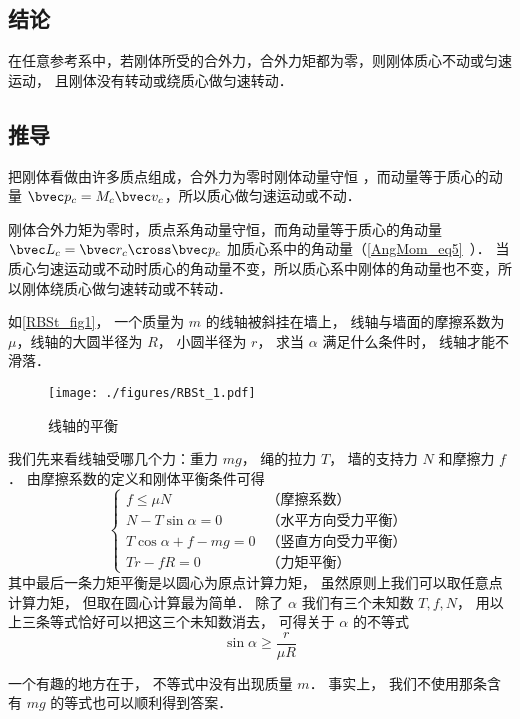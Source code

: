 
\subsection{结论}
在任意参考系中，若刚体所受的合外力，合外力矩都为零，则刚体质心不动或匀速运动， 且刚体没有转动或绕质心做匀速转动．

\subsection{推导}
把刚体看做由许多质点组成，合外力为零时刚体动量守恒%
，而动量等于质心的动量
$\bvec p_c = M_c \bvec v_c$，所以质心做匀速运动或不动．

刚体合外力矩为零时，质点系角动量守恒，而角动量等于质心的角动量 $\bvec L_c =\bvec r_c\cross \bvec p_c$ 加质心系中的角动量（\autoref{AngMom_eq5}~）． 当质心匀速运动或不动时质心的角动量不变，所以质心系中刚体的角动量也不变，所以刚体绕质心做匀速转动或不转动．

\begin{example}{}\label{RBSt_ex1}
如\autoref{RBSt_fig1}， 一个质量为 $m$ 的线轴被斜挂在墙上， 线轴与墙面的摩擦系数为 $\mu$，线轴的大圆半径为 $R$， 小圆半径为 $r$， 求当 $\alpha$ 满足什么条件时， 线轴才能不滑落．
\begin{figure}[ht]
\centering
\texttt{[image: ./figures/RBSt\_1.pdf]}
\caption{线轴的平衡} \label{RBSt_fig1}
\end{figure}

我们先来看线轴受哪几个力：重力 $mg$， 绳的拉力 $T$， 墙的支持力 $N$ 和摩擦力 $f$． 由摩擦系数的定义和刚体平衡条件可得
\begin{equation}
\begin{cases}
f \leqslant \mu N & \text{（摩擦系数）}\\
N - T\sin\alpha = 0 & \text{（水平方向受力平衡）}\\
T\cos\alpha + f - mg = 0 & \text{（竖直方向受力平衡）}\\
Tr - fR = 0 & \text{（力矩平衡）}
\end{cases}
\end{equation}
其中最后一条力矩平衡是以圆心为原点计算力矩， 虽然原则上我们可以取任意点计算力矩， 但取在圆心计算最为简单． 除了 $\alpha$ 我们有三个未知数 $T, f, N$， 用以上三条等式恰好可以把这三个未知数消去， 可得关于 $\alpha$ 的不等式
\begin{equation}
\sin\alpha \geqslant \frac{r}{\mu R}
\end{equation}

一个有趣的地方在于， 不等式中没有出现质量 $m$． 事实上， 我们不使用那条含有 $mg$ 的等式也可以顺利得到答案．
\end{example}
